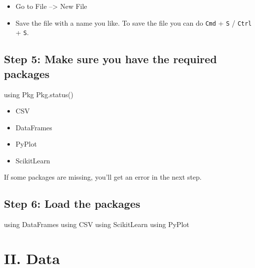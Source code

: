 \documentclass[
  letterpaper,
]{book}
\newenvironment{Shaded}{\begin{snugshade}}{\end{snugshade}}
\newcommand{\BuiltInTok}[1]{\textcolor[rgb]{0.00,0.23,0.31}{#1}}
\newcommand{\FunctionTok}[1]{\textcolor[rgb]{0.28,0.35,0.67}{#1}}
\newcommand{\ImportTok}[1]{\textcolor[rgb]{0.00,0.46,0.62}{#1}}
\newcommand{\NormalTok}[1]{\textcolor[rgb]{0.00,0.23,0.31}{#1}}
\providecommand{\tightlist}{%
  \setlength{\itemsep}{0pt}\setlength{\parskip}{0pt}}\usepackage{longtable,booktabs,array}
\begin{document}
\begin{itemize}
\tightlist
\item
  Go to File --\textgreater{} New File
\item
  Save the file with a name you like. To save the file you can do
  \texttt{Cmd} + \texttt{S} / \texttt{Ctrl} + \texttt{S}.
\end{itemize}

\hypertarget{step-5-make-sure-you-have-the-required-packages}{%
\subsection*{Step 5: Make sure you have the required
packages}\label{step-5-make-sure-you-have-the-required-packages}}

\begin{Shaded}
\begin{Highlighting}[]
\ImportTok{using} \BuiltInTok{Pkg}
\BuiltInTok{Pkg}\NormalTok{.}\FunctionTok{status}\NormalTok{()}
\end{Highlighting}
\end{Shaded}

\begin{itemize}
\tightlist
\item
  CSV
\item
  DataFrames
\item
  PyPlot
\item
  ScikitLearn
\end{itemize}

If some packages are missing, you'll get an error in the next step.

\hypertarget{step-6-load-the-packages}{%
\subsection*{Step 6: Load the packages}\label{step-6-load-the-packages}}

\begin{Shaded}
\begin{Highlighting}[]
\ImportTok{using} \BuiltInTok{DataFrames}
\ImportTok{using} \BuiltInTok{CSV}
\ImportTok{using} \BuiltInTok{ScikitLearn}
\ImportTok{using} \BuiltInTok{PyPlot}
\end{Highlighting}
\end{Shaded}

\hypertarget{ii.-data}{%
\section*{II. Data}\label{ii.-data}}
\end{document}
